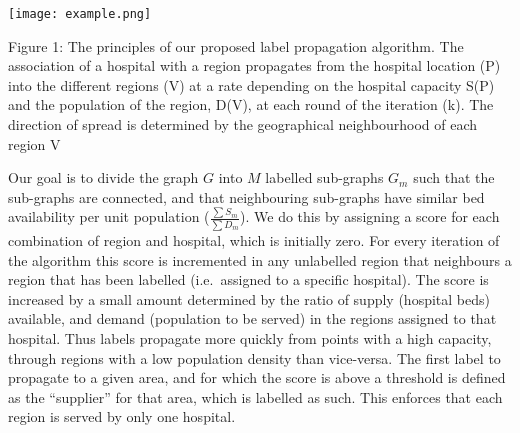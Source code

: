 \documentclass[
]{article}
\begin{document}
\texttt{[image: example.png]}

Figure 1: The principles of our proposed label propagation algorithm.
The association of a hospital with a region propagates from the hospital
location (P) into the different regions (V) at a rate depending on the
hospital capacity S(P) and the population of the region, D(V), at each
round of the iteration (k). The direction of spread is determined by the
geographical neighbourhood of each region V

Our goal is to divide the graph \(G\) into \(M\) labelled sub-graphs
\(G_m\) such that the sub-graphs are connected, and that neighbouring
sub-graphs have similar bed availability per unit population
(\(\frac{\sum S_m}{\sum D_m}\)). We do this by assigning a score for
each combination of region and hospital, which is initially zero. For
every iteration of the algorithm this score is incremented in any
unlabelled region that neighbours a region that has been labelled
(i.e.~assigned to a specific hospital). The score is increased by a
small amount determined by the ratio of supply (hospital beds)
available, and demand (population to be served) in the regions assigned
to that hospital. Thus labels propagate more quickly from points with a
high capacity, through regions with a low population density than
vice-versa. The first label to propagate to a given area, and for which
the score is above a threshold is defined as the ``supplier'' for that
area, which is labelled as such. This enforces that each region is
served by only one hospital.
\end{document}
